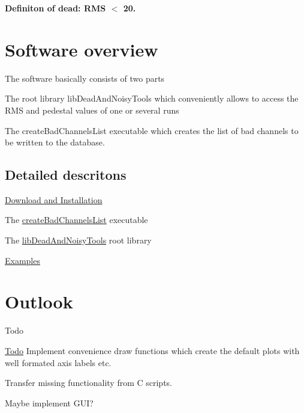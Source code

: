 {\bfseries Definiton of dead\-: R\-M\-S $<$ 20. }\hypertarget{index_SWOverview}{}\section{Software overview}\label{index_SWOverview}
The software basically consists of two parts \begin{DoxyItemize}
\item The root library {\ttfamily lib\-Dead\-And\-Noisy\-Tools} which conveniently allows to access the R\-M\-S and pedestal values of one or several runs \item The {\ttfamily create\-Bad\-Channels\-List} executable which creates the list of bad channels to be written to the database.\end{DoxyItemize}
\hypertarget{index_pages}{}\subsection{Detailed descritons}\label{index_pages}
\begin{DoxyItemize}
\item \hyperlink{download_install}{Download and Installation} \item The \hyperlink{create_bad_channels_list_exe}{create\-Bad\-Channels\-List} executable \item The \hyperlink{root_lib}{lib\-Dead\-And\-Noisy\-Tools} root library \item \hyperlink{_examples}{Examples}\end{DoxyItemize}
\hypertarget{index_Outlook}{}\section{Outlook}\label{index_Outlook}
\begin{DoxyRefDesc}{Todo}
\item[\hyperlink{todo__todo000007}{Todo}]Implement convenience draw functions which create the default plots with well formated axis labels etc. 

Transfer missing functionality from C scripts. 

Maybe implement G\-U\-I?\end{DoxyRefDesc}

